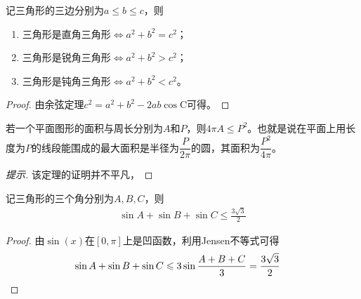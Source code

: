 \begin{theorem}[Pythagorean不等式]
  记三角形的三边分别为$a\le b\le c$，则
  \begin{enumerate}
  \item 三角形是直角三角形$\iff a^2+b^2=c^2$；
  \item 三角形是锐角三角形$\iff a^2+b^2>c^2$；
  \item 三角形是钝角三角形$\iff a^2+b^2<c^2$。
  \end{enumerate}
\end{theorem}
\begin{proof}
  由余弦定理$c^2=a^2+b^2-2ab\cos\mathrm{C}$可得。
\end{proof}


\begin{theorem}
  若一个平面图形的面积与周长分别为$A$和$P$，则$4\pi A\le P^2$。也就是说在平面上用长度为$P$的线段能围成的最大面积是半径为$\dfrac{P}{2\pi}$的圆，其面积为$\dfrac{P^2}{4\pi}$。
\end{theorem}
\begin{proof}[提示]
  该定理的证明并不平凡，
\end{proof}

\begin{theorem}
  记三角形的三个角分别为$A,B,C$，则
  \begin{align*}
    \sin A +\sin B + \sin C \le\frac{3\sqrt3}{2}
  \end{align*}
\end{theorem}
\begin{proof}
  由$\sin(x)$在$[0,\pi]$上是凹函数，利用Jensen不等式可得
  \begin{align*}
    \sin A + \sin B + \sin C \le 3\sin\frac{A+B+C}3 =\frac{3\sqrt3}{2}&\qedhere
  \end{align*}
\end{proof}

